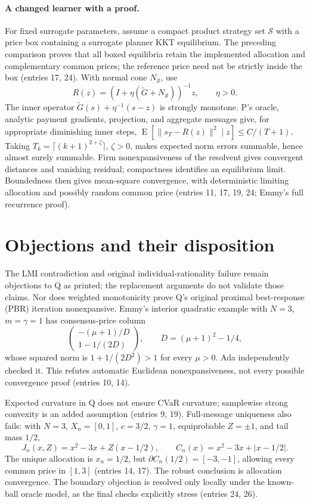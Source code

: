 \documentclass{article}
\begin{document}
\paragraph{A changed learner with a proof.}
For fixed surrogate parameters, assume a compact product strategy set
\(\mathcal S\) with a price box containing a surrogate planner KKT
equilibrium. The preceding comparison proves that all boxed equilibria
retain the implemented allocation and complementary common prices; the
reference price need not be strictly inside the box (entries 17, 24).
With normal cone \(N_{\mathcal S}\), use
\[
 R(z)=(I+\eta(\widetilde G+N_{\mathcal S}))^{-1}z,\qquad\eta>0.
\]
The inner operator \(\widetilde G(s)+\eta^{-1}(s-z)\) is strongly
monotone. P's oracle, analytic payment gradients, projection, and aggregate
messages give, for appropriate diminishing inner steps,
\(\operatorname{E}[\|s_T-R(z)\|^2\mid z]\le C/(T+1)\).
Taking \(T_k=\lceil(k+1)^{2+\zeta}\rceil\), \(\zeta>0\), makes expected
norm errors summable, hence almost surely summable. Firm nonexpansiveness
of the resolvent gives convergent distances and vanishing residual;
compactness identifies an equilibrium limit. Boundedness then gives
mean-square convergence, with deterministic limiting allocation and possibly
random common price (entries 11, 17, 19, 24; Emmy's full recurrence proof).

\section*{Objections and their disposition}
The LMI contradiction and original individual-rationality failure remain
objections to Q as printed; the replacement arguments do not validate those
claims. Nor does weighted monotonicity prove Q's original proximal
best-response (PBR) iteration nonexpansive. Emmy's interior quadratic example
with \(N=3\), \(m=\gamma=1\) has consensus-price column
\[
 \begin{pmatrix}-(\mu+1)/D\\1-1/(2D)\end{pmatrix},\qquad
 D=(\mu+1)^2-1/4,
\]
whose squared norm is \(1+1/(2D^2)>1\) for every \(\mu>0\).
Ada independently checked it. This refutes automatic Euclidean
nonexpansiveness, not every possible convergence proof (entries 10, 14).

Expected curvature in Q does not ensure CVaR curvature; samplewise strong
convexity is an added assumption (entries 9, 19). Full-message uniqueness
also fails: with \(N=3\), \(X_n=[0,1]\), \(c=3/2\), \(\gamma=1\),
equiprobable \(Z=\pm1\), and tail mass \(1/2\),
\[
 J_n(x,Z)=x^2-3x+Z(x-1/2),\qquad
 C_n(x)=x^2-3x+|x-1/2|.
\]
The unique allocation is \(x_n=1/2\), but
\(\partial C_n(1/2)=[-3,-1]\), allowing every common price in \([1,3]\)
(entries 14, 17). The robust conclusion is allocation convergence.
The boundary objection is resolved only locally under the known-ball oracle
model, as the final checks explicitly stress (entries 24, 26).
\end{document}
